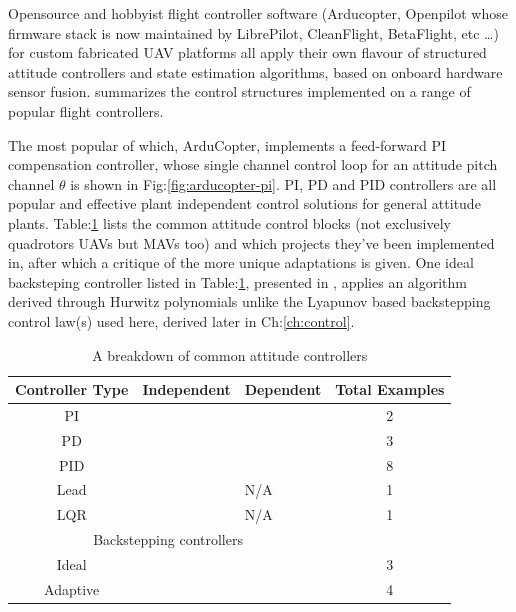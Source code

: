 \par
Opensource and hobbyist flight controller software (Arducopter\cite{arducoptersite}, Openpilot\cite{openpilotsite} whose firmware stack is now maintained by LibrePilot, CleanFlight\cite{cleanflight}, BetaFlight\cite{betaflight}, etc \ldots) for custom fabricated UAV platforms all apply their own flavour of structured attitude controllers and state estimation algorithms, based on onboard hardware sensor fusion. \cite{buildyourownquad} summarizes the control structures implemented on a range of popular flight controllers. 
\par
The most popular of which, ArduCopter, implements a feed-forward PI compensation controller, whose single channel control loop for an attitude pitch channel $\theta$ is shown in Fig:\ref{fig:arducopter-pi}.  PI, PD and PID controllers are all popular and effective plant independent control solutions for general attitude plants. Table:\ref{tab:controllers} lists the common attitude control blocks (not exclusively quadrotors UAVs but MAVs too) and which projects they've been implemented in, after which a critique of the more unique adaptations is given. One ideal backsteping controller listed in Table:\ref{tab:controllers}, presented in \cite{tpheonix}, applies an algorithm derived through Hurwitz polynomials unlike the Lyapunov based backstepping control law(s) used here, derived later in Ch:\ref{ch:control}.
\begin{table}[h]
\centering
\begin{tabular}{ |c|l|l|c| }
\hline
Controller Type & Independent & Dependent & Total Examples\\ \hline
PI & \cite{attitudecontrolproblem} & \cite{attitudecontrolproblem} & 2\\ \hline
PD & \cite{tiltrihani} & \cite{fullquaternion,singleaxistilting} & 3\\ \hline
PID & \cite{optimizedpidquadcopter, attitudecontrolproblem, quaddynamics, tiltpropellercontrol, pidlqr} & \cite{attitudecontrolproblem, starmac, adaptivedisturbancecontrol} & 8\\ \hline
Lead & \cite{x4flyer} & N/A & 1\\ \hline
LQR & \cite{pidlqr} & N/A & 1\\ 
\hline
\multicolumn{3}{|c|}{Backstepping controllers} & \\
\hline
Ideal & \cite{tpheonix, backsteppingquadcoptercontrol} & \cite{backsteppingquadcoptercontrol} & 3\\ \hline
Adaptive & \multicolumn{2}{l|}{\cite{adaptivebackstep, nonlinearadaptive, 6dofbackstep, intelligentbackstep}} & 4\\ \hline
\end{tabular}
\caption{A breakdown of common attitude controllers}
\label{tab:controllers}
\end{table}
